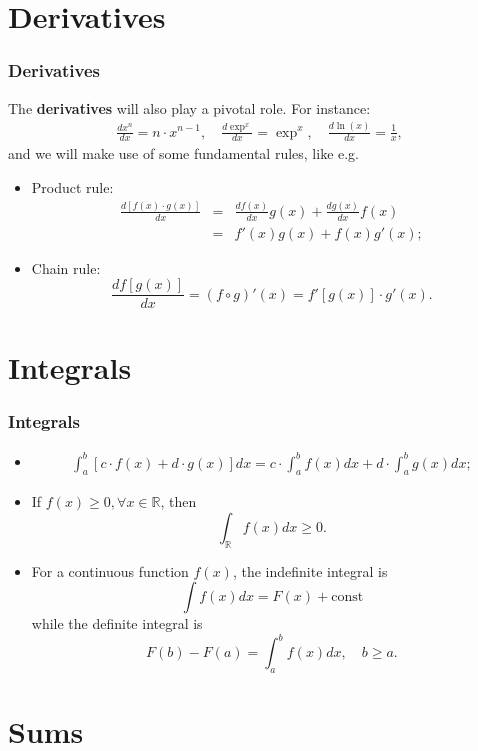 \documentclass[notes=show,handout]{beamer}\usepackage[]{graphicx}\usepackage[]{color}
\newcommand{\bea}{\begin{eqnarray}}
\newcommand{\eea}{\end{eqnarray}}
\newcommand{\nn}{\nonumber}
\begin{document}
\section{Derivatives}

\begin{frame}
\frametitle{Derivatives}

The \textbf{derivatives} will also play a pivotal role. For instance:
\bea
 \frac{d x^n}{dx} = n \cdot x^{n-1}, \quad \frac{d \exp^{x}}{dx} = \exp^{x} , \quad
\frac{d \ln({x})}{dx} = \frac{1}{x}, \nn
\eea
and we will make use of some fundamental rules, like e.g.

\begin{itemize}
\item Product rule:
\bea
\frac{d [f(x)\cdot g(x)]}{dx} &=& \frac{df(x)}{dx} g(x) + \frac{dg(x)}{dx} f(x) \nn \\
&=& f'(x) g(x)+ f(x) g'(x) \nn ;
\eea
\item Chain rule: $$ \frac{d f[g(x)]}{dx} =  (f\circ g)'(x) = f'[g(x)] \cdot g'(x). $$
\end{itemize}
\end{frame}

\section{Integrals}
\begin{frame}
\frametitle{Integrals}

\begin{itemize}
\item \bea
\int_{a}^{b} \left[c \cdot f(x) + d \cdot g(x) \right]dx = c  \cdot \int_{a}^{b}   f(x) dx + d \cdot \int_{a}^{b}   g(x) dx; \nn
\eea
\item If $f(x) \geq 0, \forall x \in \mathbb{R}$, then
$$ \int_{\mathbb{R}} f(x) dx \geq 0. $$
\item For a continuous function $f(x)$, the indefinite integral is
$$
\int f(x) dx = F(x) + \text{const}
$$
while the definite integral is
$$
F(b)-F(a)= \int_{a}^{b} f(x) dx, \quad b \geq a.
$$
\end{itemize}
\end{frame}

\section{Sums}
\end{document}

